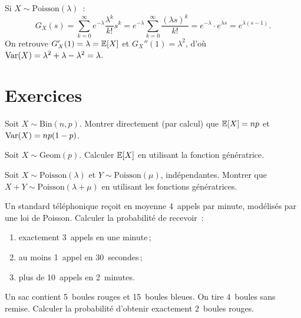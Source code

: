 \begin{exemple}
Si $X \sim \text{Poisson}(\lambda)$~:
\[
    G_X(s) = \sum_{k=0}^{\infty} e^{-\lambda} \frac{\lambda^k}{k!} s^k
    = e^{-\lambda} \sum_{k=0}^{\infty} \frac{(\lambda s)^k}{k!}
    = e^{-\lambda} \cdot e^{\lambda s}
    = e^{\lambda(s-1)}.
\]
On retrouve $G_X'(1) = \lambda = \mathbb{E}[X]$ et
$G_X''(1) = \lambda^2$, d'o\`u $\mathrm{Var}(X) = \lambda^2 + \lambda - \lambda^2 = \lambda$.
\end{exemple}

\section{Exercices}

\begin{exercice}
Soit $X \sim \text{Bin}(n, p)$. Montrer directement (par calcul) que
$\mathbb{E}[X] = np$ et $\mathrm{Var}(X) = np(1-p)$.
\end{exercice}

\begin{exercice}
Soit $X \sim \text{Geom}(p)$. Calculer $\mathbb{E}[X]$ en utilisant la fonction
g\'en\'eratrice.
\end{exercice}

\begin{exercice}
Soit $X \sim \text{Poisson}(\lambda)$ et $Y \sim \text{Poisson}(\mu)$,
ind\'ependantes. Montrer que $X + Y \sim \text{Poisson}(\lambda + \mu)$ en
utilisant les fonctions g\'en\'eratrices.
\end{exercice}

\begin{exercice}
Un standard t\'el\'ephonique re\c{c}oit en moyenne 4~appels par minute, mod\'elis\'es
par une loi de Poisson. Calculer la probabilit\'e de recevoir~:
\begin{enumerate}[label=(\alph*)]
    \item exactement 3~appels en une minute\,;
    \item au moins 1~appel en 30~secondes\,;
    \item plus de 10~appels en 2~minutes.
\end{enumerate}
\end{exercice}

\begin{exercice}
Un sac contient 5~boules rouges et 15~boules bleues. On tire 4~boules sans remise.
Calculer la probabilit\'e d'obtenir exactement 2~boules rouges.
\end{exercice}


